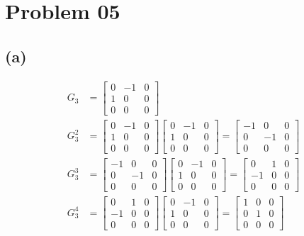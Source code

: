 \documentclass[letterpaper]{article}
\begin{document}
\section*{Problem 05} 
\subsection*{(a)}
\begin{align*}
	G_3 &= 
	\begin{bmatrix} 0&-1&0\\1&0&0\\0&0&0 \end{bmatrix}  \\ 
	G_3^2  &= 
	\begin{bmatrix} 0&-1&0\\1&0&0\\0&0&0 \end{bmatrix}  
	\begin{bmatrix} 0&-1&0\\1&0&0\\0&0&0 \end{bmatrix} = 
	\begin{bmatrix} -1&0&0\\0&-1&0\\0&0&0 \end{bmatrix} \\ 
	G_3^{3} &= 
	\begin{bmatrix} -1&0&0\\0&-1&0\\0&0&0 \end{bmatrix} 
	\begin{bmatrix} 0&-1&0\\1&0&0\\0&0&0 \end{bmatrix}  = 
	\begin{bmatrix} 0&1&0\\-1&0&0\\0&0&0 \end{bmatrix}  \\ 
	G_3^4	&= 
	\begin{bmatrix} 0&1&0\\-1&0&0\\0&0&0 \end{bmatrix}
	\begin{bmatrix} 0&-1&0\\1&0&0\\0&0&0 \end{bmatrix}  = 
	\begin{bmatrix} 1&0&0\\0&1&0\\0&0&0 \end{bmatrix} 

\end{align*}
\end{document}
